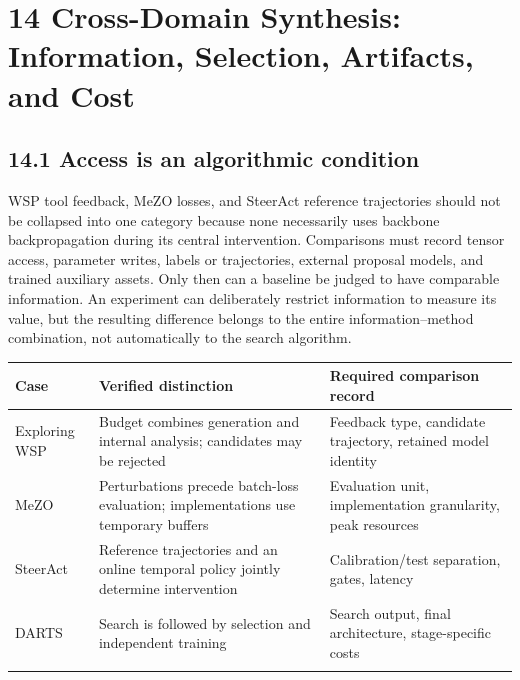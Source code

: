 \section*{14 Cross-Domain Synthesis: Information, Selection, Artifacts, and Cost}

\subsection*{14.1 Access is an algorithmic condition}

WSP tool feedback, MeZO losses, and SteerAct reference trajectories should not be collapsed into one category because none necessarily uses backbone backpropagation during its central intervention. Comparisons must record tensor access, parameter writes, labels or trajectories, external proposal models, and trained auxiliary assets. Only then can a baseline be judged to have comparable information. An experiment can deliberately restrict information to measure its value, but the resulting difference belongs to the entire information–method combination, not automatically to the search algorithm.


\begingroup\small\setlength{\tabcolsep}{5pt}\renewcommand{\arraystretch}{1.18}

\begin{longtable}{>{\raggedright\arraybackslash}p{4.85cm}>{\raggedright\arraybackslash}p{4.85cm}>{\raggedright\arraybackslash}p{4.85cm}}

\toprule

\textbf{Case} & \textbf{Verified distinction} & \textbf{Required comparison record}\\\midrule\endhead

Exploring WSP \cite{r1} & Budget combines generation and internal analysis; candidates may be rejected & Feedback type, candidate trajectory, retained model identity\\\addlinespace[3pt]

MeZO \cite{r52} & Perturbations precede batch-loss evaluation; implementations use temporary buffers & Evaluation unit, implementation granularity, peak resources\\\addlinespace[3pt]

SteerAct \cite{r176} & Reference trajectories and an online temporal policy jointly determine intervention & Calibration/test separation, gates, latency\\\addlinespace[3pt]

DARTS \cite{r136} & Search is followed by selection and independent training & Search output, final architecture, stage-specific costs\\\addlinespace[3pt]

\bottomrule\end{longtable}\endgroup

